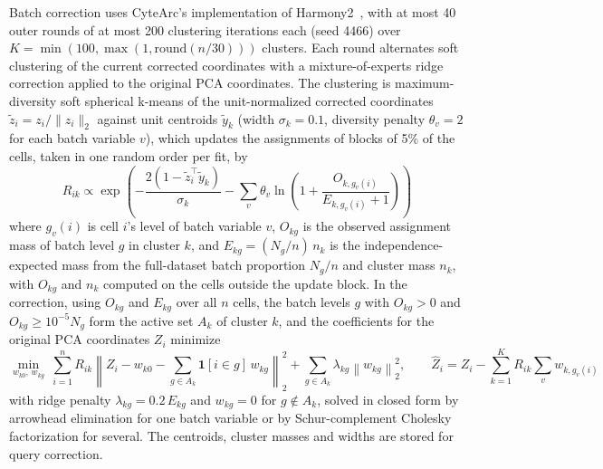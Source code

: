 \documentclass[11pt]{article}
\begin{document}
Batch correction uses CyteArc's implementation of Harmony2~\cite{korsunsky2019,patikas2026integration}, with at most 40 outer rounds of at most 200 clustering iterations each (seed 4466) over $K=\min(100,\max(1,\mathrm{round}(n/30)))$ clusters. Each round alternates soft clustering of the current corrected coordinates with a mixture-of-experts ridge correction applied to the original PCA coordinates. The clustering is maximum-diversity soft spherical k-means of the unit-normalized corrected coordinates $\tilde z_i=z_i/\lVert z_i\rVert_2$ against unit centroids $\tilde y_k$ (width $\sigma_k=0.1$, diversity penalty $\theta_v=2$ for each batch variable $v$), which updates the assignments of blocks of 5\% of the cells, taken in one random order per fit, by
\[
R_{ik}\propto\exp\left(-\frac{2\left(1-\tilde z_i^{\top}\tilde y_k\right)}{\sigma_k}-\sum_{v}\theta_v\ln\left(1+\frac{O_{k,g_v(i)}}{E_{k,g_v(i)}+1}\right)\right)
\]
where $g_v(i)$ is cell $i$'s level of batch variable $v$, $O_{kg}$ is the observed assignment mass of batch level $g$ in cluster $k$, and $E_{kg}=(N_g/n)\,n_k$ is the independence-expected mass from the full-dataset batch proportion $N_g/n$ and cluster mass $n_k$, with $O_{kg}$ and $n_k$ computed on the cells outside the update block. In the correction, using $O_{kg}$ and $E_{kg}$ over all $n$ cells, the batch levels $g$ with $O_{kg}>0$ and $O_{kg}\ge10^{-5}N_g$ form the active set $A_k$ of cluster $k$, and the coefficients for the original PCA coordinates $Z_i$ minimize
\[
\min_{w_{k0},\,w_{kg}}\ \sum_{i=1}^{n}R_{ik}\left\lVert Z_i-w_{k0}-\sum_{g\in A_k}\mathbf{1}[i\in g]\,w_{kg}\right\rVert_2^{2}+\sum_{g\in A_k}\lambda_{kg}\left\lVert w_{kg}\right\rVert_2^{2},\qquad \hat Z_i=Z_i-\sum_{k=1}^{K}R_{ik}\sum_{v}w_{k,g_v(i)}
\]
with ridge penalty $\lambda_{kg}=0.2\,E_{kg}$ and $w_{kg}=0$ for $g\notin A_k$, solved in closed form by arrowhead elimination for one batch variable or by Schur-complement Cholesky factorization for several. The centroids, cluster masses and widths are stored for query correction.
\end{document}
